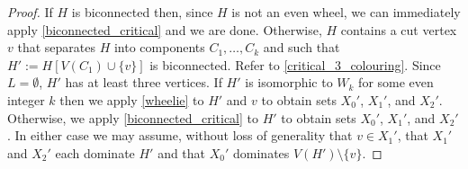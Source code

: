 \documentclass[12pt]{article}
\theoremstyle{definition}
\begin{document}
\begin{proof}
  If $H$ is biconnected then, since $H$ is not an even wheel, we can immediately apply \cref{biconnected_critical} and we are done.  Otherwise, $H$ contains a cut vertex $v$ that separates $H$ into components $C_1,\ldots,C_k$ and such that $H':=H[V(C_1)\cup\{v\}]$ is biconnected. Refer to \cref{critical_3_colouring}. Since $L=\emptyset$, $H'$ has at least three vertices. If $H'$ is isomorphic to $W_k$ for some even integer $k$ then we apply \cref{wheelie} to $H'$ and $v$ to obtain sets $X_0'$, $X_1'$, and $X_2'$. Otherwise, we apply \cref{biconnected_critical} to $H'$ to obtain sets $X_0'$, $X_1'$, and $X_2'$.  In either case we may assume, without loss of generality that $v\in X_1'$, that $X_1'$ and $X_2'$ each dominate $H'$ and that $X_0'$ dominates $V(H')\setminus\{v\}$.


\end{proof}
\end{document}
